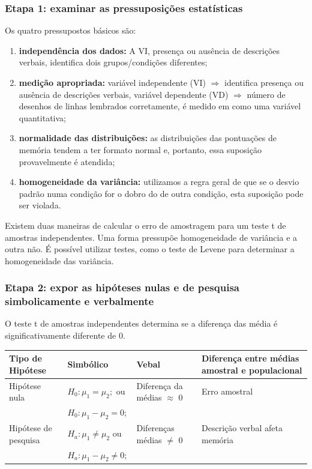 \documentclass[11pt]{beamer}
\begin{document}
\begin{frame}
\frametitle{Etapa 1: examinar as pressuposições estatísticas}

Os quatro pressupostos básicos são:

\begin{enumerate}
\item \textbf{independência dos dados:} A VI, presença ou ausência de descrições verbais, identifica dois grupos/condições diferentes;
\item \textbf{medição apropriada:} variável independente (VI) \(\Rightarrow\) identifica presença ou ausência de descrições verbais, variável dependente (VD) \(\Rightarrow\) número de desenhos de linhas lembrados corretamente, é medido em como uma variável quantitativa;
\item \textbf{normalidade das distribuições:} as distribuições das pontuações de memória tendem a ter formato normal e, portanto, essa suposição provavelmente é atendida;
\item \textbf{homogeneidade da variância:} utilizamos a regra geral de que se o desvio padrão numa condição for o dobro do de outra condição, esta suposição pode ser violada.
\end{enumerate}

Existem duas maneiras de calcular o erro de amostragem para um teste t de amostras independentes. Uma forma pressupõe homogeneidade de variância e a outra não. É possível utilizar testes, como o teste de Levene para determinar a homogeneidade das variância.

\end{frame}

\begin{frame}
\frametitle{Etapa 2: expor as hipóteses nulas e de pesquisa simbolicamente e verbalmente}

O teste t de amostras independentes determina se a diferença das média é significativamente diferente de 0.

\begin{center}
\begin{tabular}{ m{2cm}|m{3cm}|m{2cm}|m{3cm} } 
 \hline
 Tipo de Hipótese & Simbólico & Vebal & Diferença entre médias amostral e populacional\\
  \hline
 Hipótese nula & $H_0:\mu_1=\mu_2;$ ou & Diferença da médias $\approx$ 0 & Erro amostral \\
 & $H_0:\mu_1-\mu_2=0;$ & &\\
 Hipótese de pesquisa & $H_a:\mu_1 \neq \mu_2$ ou & Diferenças médias $\neq$ 0 & Descrição verbal afeta memória  \\ 
  & $H_a:\mu_1-\mu_2\neq0;$ & &\\
 \hline
 \hline
\end{tabular}
\end{center}

\end{frame}
\end{document}
